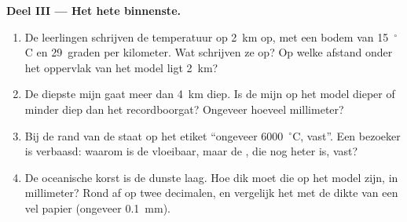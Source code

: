 \begin{problem}
\medskip
\noindent\textbf{Deel III --- Het hete binnenste.}
\begin{enumerate}[resume]
  \item De leerlingen schrijven de temperatuur op 2~km op, met een bodem
        van 15~$^\circ$C en 29~graden per kilometer. Wat schrijven ze op?
        Op welke afstand onder het oppervlak van het model ligt 2~km?
  \item De diepste mijn gaat meer dan 4~km diep. Is de mijn op het model
        dieper of minder diep dan het recordboorgat? Ongeveer hoeveel
        millimeter?
  \item Bij de rand van de  staat op het etiket ``ongeveer
        6000~$^\circ$C, vast''. Een bezoeker is verbaasd: waarom is de
         vloeibaar, maar de , die nog heter is, vast?
  \item De oceanische korst is de dunste laag. Hoe dik moet die op het
        model zijn, in millimeter? Rond af op twee decimalen, en vergelijk
        het met de dikte van een vel papier (ongeveer 0.1~mm).
\end{enumerate}
\end{problem}
